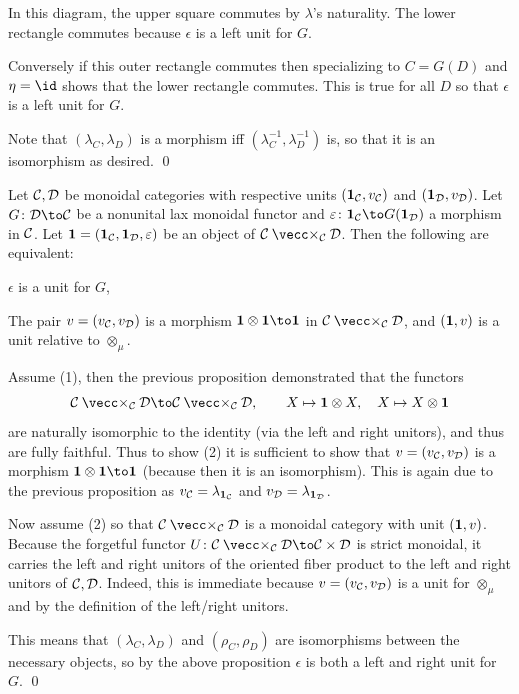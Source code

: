     In this diagram, the upper square commutes by $\lambda$'s naturality.
    The lower rectangle commutes because $\epsilon$ is a left unit for $G$.

    Conversely if this outer rectangle commutes then specializing to $C=G(D)$ and $\eta=\id$ shows that the lower rectangle commutes.
    This is true for all $D$ so that $\epsilon$ is a left unit for $G$.

    Note that $(\lambda_C,\lambda_D)$ is a morphism iff $(\lambda_C^{-1},\lambda_D^{-1})$ is, so that it is an isomorphism as desired.
    \qed

\eproof

\bcoro

    Let ${{\cal C}},{{\cal D}}$ be monoidal categories with respective units $({\bf1}_{{\cal C}},v_{{\cal C}})$ and $({\bf1}_{{\cal D}},v_{{\cal D}})$.
    Let $G\colon\D\to\C$ be a nonunital lax monoidal functor and $\epsilon\colon\1_\C\to G(\1_\D)$ a morphism in ${{\cal C}}$.
    Let ${\bf1}=({\bf1}_{{\cal C}},{\bf1}_{{\cal D}},\varepsilon)$ be an object of $\C\ortimes_\C\D$.
    Then the following are equivalent:
    \benum
        \item $\epsilon$ is a unit for $G$,
        \item The pair $v=(v_{{\cal C}},v_{{\cal D}})$ is a morphism $\1\otimes\1\to\1$ in $\C\ortimes_\C\D$, and $({\bf1},v)$ is a unit relative to $\otimes_\mu$.
    \eenum

\ecoro

\bproof

    Assume (1), then the previous proposition demonstrated that the functors
    $$ \C\ortimes_\C\D\to\C\ortimes_\C\D,\qquad X\mapsto\1\otimes X,\quad X\mapsto X\otimes\1 $$
    are naturally isomorphic to the identity (via the left and right unitors), and thus are fully faithful.
    Thus to show (2) it is sufficient to show that $v=(v_{{\cal C}},v_{{\cal D}})$ is a morphism $\1\otimes\1\to\1$ (because then it is an isomorphism).
    This is again due to the previous proposition as $v_{{\cal C}}=\lambda_{{\bf1}_{{\cal C}}}$ and $v_{{\cal D}}=\lambda_{{\bf1}_{{\cal D}}}$.

    Now assume (2) so that $\C\ortimes_\C\D$ is a monoidal category with unit $({\bf1},v)$.
    Because the forgetful functor $U\colon\C\ortimes_\C\D\to\C\times\D$ is strict monoidal, it carries the left and right unitors of the oriented fiber product
    to the left and right unitors of ${{\cal C}},{{\cal D}}$.
    Indeed, this is immediate because $v=(v_{{\cal C}},v_{{\cal D}})$ is a unit for $\otimes_\mu$ and by the definition of the left/right unitors.

    This means that $(\lambda_C,\lambda_D)$ and $(\rho_C,\rho_D)$ are isomorphisms between the necessary objects, so by the above proposition
    $\epsilon$ is both a left and right unit for $G$.
    \qed

